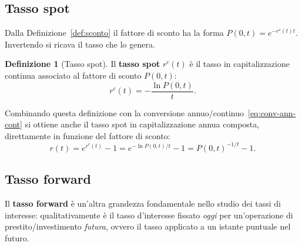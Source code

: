 \documentclass[11pt,a4paper]{article}
\theoremstyle{plain}
\theoremstyle{definition}
\newtheorem{definizione}[teorema]{Definizione}
\theoremstyle{remark}
\begin{document}
\subsection{Tasso spot}

Dalla Definizione~\ref{def:sconto} il fattore di sconto ha la forma $P(0,t)=e^{-r^c(t)t}$.
Invertendo si ricava il tasso che lo genera.

\begin{definizione}[Tasso spot]
\label{def:spot}
Il \textbf{tasso spot} $r^c(t)$ \`e il tasso in capitalizzazione continua associato al
fattore di sconto $P(0,t)$:
\begin{equation}
  r^c(t) = -\frac{\ln P(0,t)}{t}.
  \label{eq:spot-inv}
\end{equation}
\end{definizione}

Combinando questa definizione con la conversione annuo/continuo~\eqref{eq:conv-ann-cont} si
ottiene anche il tasso spot in capitalizzazione annua composta, direttamente in funzione del
fattore di sconto:
\begin{equation}
  r(t) = e^{r^c(t)} - 1 = e^{-\ln P(0,t)/t} - 1 = P(0,t)^{-1/t} - 1.
  \label{eq:spot-ann-inv}
\end{equation}



\subsection{Tasso forward}

Il \textbf{tasso forward} \`e un'altra grandezza fondamentale nello studio dei tassi di
interesse: qualitativamente \`e il tasso d'interesse fissato \emph{oggi} per un'operazione di
prestito/investimento \emph{futura}, ovvero il tasso applicato a un istante
puntuale nel futuro. 
\end{document}
